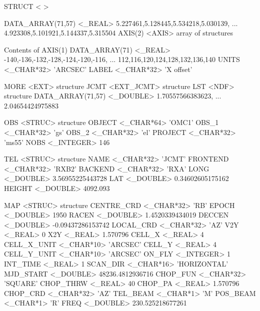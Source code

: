 \documentclass[11pt,noabs]{starlink}
\begin{document}
\begin{terminalv}
STRUCT  < >

  DATA_ARRAY(71,57)  <_REAL>     5.227461,5.128445,5.534218,5.030139,
                                 ... 4.923308,5.101921,5.144337,5.315504
  AXIS(2)        <AXIS>          {array of structures}

  Contents of AXIS(1)
     DATA_ARRAY(71)  <_REAL>        -140,-136,-132,-128,-124,-120,-116,
                                    ... 112,116,120,124,128,132,136,140
     UNITS          <_CHAR*32>      'ARCSEC'
     LABEL          <_CHAR*32>      'X offset'

  MORE           <EXT>           {structure}
     JCMT           <EXT_JCMT>      {structure}
        LST            <NDF>           {structure}
           DATA_ARRAY(71,57)  <_DOUBLE>   1.70557566383623,
                                          ... 2.04654424975883

        OBS            <STRUC>         {structure}
           OBJECT         <_CHAR*64>      'OMC1'
           OBS_1          <_CHAR*32>      'gs'
           OBS_2          <_CHAR*32>      'el'
           PROJECT        <_CHAR*32>      'ms55'
           NOBS           <_INTEGER>      146

        TEL            <STRUC>         {structure}
           NAME           <_CHAR*32>      'JCMT'
           FRONTEND       <_CHAR*32>      'RXB2'
           BACKEND        <_CHAR*32>      'RXA'
           LONG           <_DOUBLE>       3.56955225443728
           LAT            <_DOUBLE>       0.34602605175162
           HEIGHT         <_DOUBLE>       4092.093

        MAP            <STRUC>         {structure}
           CENTRE_CRD     <_CHAR*32>      'RB'
           EPOCH          <_DOUBLE>       1950
           RACEN          <_DOUBLE>       1.4520339434019
           DECCEN         <_DOUBLE>       -0.09437286153742
           LOCAL_CRD      <_CHAR*32>      'AZ'
           V2Y            <_REAL>         0
           X2Y            <_REAL>         1.570796
           CELL_X         <_REAL>         4
           CELL_X_UNIT    <_CHAR*10>      'ARCSEC'
           CELL_Y         <_REAL>         4
           CELL_Y_UNIT    <_CHAR*10>      'ARCSEC'
           ON_FLY         <_INTEGER>      1
           INT_TIME       <_REAL>         1
           SCAN_DIR       <_CHAR*16>      'HORIZONTAL'
           MJD_START      <_DOUBLE>       48236.4812936716
           CHOP_FUN       <_CHAR*32>      'SQUARE'
           CHOP_THRW      <_REAL>         40
           CHOP_PA        <_REAL>         1.570796
           CHOP_CRD       <_CHAR*32>      'AZ'
           TEL_BEAM       <_CHAR*1>       'M'
           POS_BEAM       <_CHAR*1>       'R'
           FREQ           <_DOUBLE>       230.525218677261


\end{terminalv}
\end{document}
